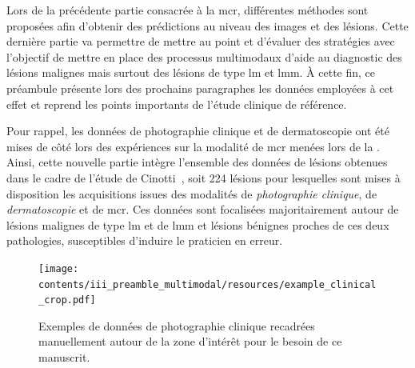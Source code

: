 \renewcommand{\thechapter}{\roman{chapter}}
\setcounter{chapter}{3}
\setcounter{figure}{0}

\label{chap:preamble_multimodal}
Lors de la précédente partie consacrée à la \acrlong{mcr}, différentes méthodes sont proposées afin d'obtenir des prédictions au niveau des images et des lésions. Cette dernière partie va permettre de mettre au point et d'évaluer des stratégies avec l'objectif de mettre en place des processus multimodaux d'aide au diagnostic des lésions malignes mais surtout des lésions de type \gls{lm} et \gls{lmm}. À cette fin, ce préambule présente lors des prochains paragraphes les données employées à cet effet et reprend les points importants de l'étude clinique de référence.\par

Pour rappel, les données de photographie clinique et de dermatoscopie ont été mises de côté lors des expériences sur la modalité de \gls{mcr} menées lors de la . Ainsi, cette nouvelle partie intègre l'ensemble des données de lésions obtenues dans le cadre de l'étude de Cinotti~, soit 224 lésions pour lesquelles sont mises à disposition les acquisitions issues des modalités de \textit{photographie clinique}, de \textit{dermatoscopie} et de \gls{mcr}. Ces données sont focalisées majoritairement autour de lésions malignes de type \gls{lm} et de \gls{lmm} et lésions bénignes proches de ces deux pathologies, susceptibles d'induire le praticien en erreur.\par 

\begin{figure}[H]
    \begin{center}
        \texttt{[image: contents/iii\_preamble\_multimodal/resources/example\_clinical\_crop.pdf]}
        \caption{Exemples de données de photographie clinique recadrées manuellement autour de la zone d'intérêt pour le besoin de ce manuscrit.}
        \label{fig:example_clinical_crop}
    \end{center} 
\end{figure}\par
\clearpage

